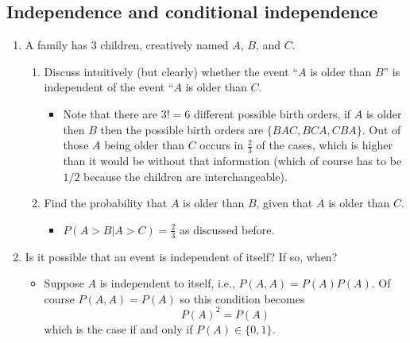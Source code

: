 \documentclass{article}
\begin{document}
\subsection{Independence and conditional independence}
\begin{enumerate}
	\item A family has 3 children, creatively named $A$, $B$, and $C$.
		\begin{enumerate}
			\item Discuss intuitively (but clearly) whether the event “$A$ is older than $B$” is independent of the event “$A$ is older than $C$.
				\begin{itemize}
					\item Note that there are $3! = 6$ different possible birth orders, if $A$ is older then $B$ then the possible birth orders are $\{BAC, BCA, CBA\}$. Out of those $A$ being older than $C$ occurs in $\frac{2}{3}$ of the cases, which is higher than it would be without that information (which of course has to be $1/2$ because the children are interchangeable).
				\end{itemize}
			\item Find the probability that $A$ is older than $B$, given that $A$ is older than $C$.
				\begin{itemize}
					\item $P(A > B | A > C) = \frac{2}{3}$ as discussed before.
				\end{itemize}
		\end{enumerate}
	\item Is it possible that an event is independent of itself? If so, when?
		\begin{itemize}
			\item Suppose $A$ is independent to itself, i.e., $P(A, A) = P(A)P(A)$. Of course $P(A, A) = P(A)$ so this condition becomes
			$$
			P(A)^2 = P(A)
			$$
			which is the case if and only if $P(A) \in \{0, 1\}$.
		\end{itemize}
\end{enumerate}
\end{document}
